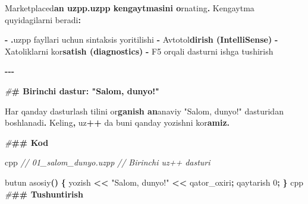 \documentclass[a4paper,11pt,twoside,openright]{book}
\newenvironment{Shaded}{\begin{snugshade}}{\end{snugshade}}
\newcommand{\CharTok}[1]{\textcolor[rgb]{0.31,0.60,0.02}{#1}}
\newcommand{\CommentTok}[1]{\textcolor[rgb]{0.56,0.35,0.01}{\textit{#1}}}
\newcommand{\DecValTok}[1]{\textcolor[rgb]{0.00,0.00,0.81}{#1}}
\newcommand{\ErrorTok}[1]{\textcolor[rgb]{0.64,0.00,0.00}{\textbf{#1}}}
\newcommand{\NormalTok}[1]{#1}
\newcommand{\OperatorTok}[1]{\textcolor[rgb]{0.81,0.36,0.00}{\textbf{#1}}}
\newcommand{\PreprocessorTok}[1]{\textcolor[rgb]{0.56,0.35,0.01}{\textit{#1}}}
\newcommand{\StringTok}[1]{\textcolor[rgb]{0.31,0.60,0.02}{#1}}
\begin{document}
\begin{Shaded}
\begin{Highlighting}[]
\NormalTok{Marketplace}\CharTok{\textquotesingle{}d}\ErrorTok{an \textasciigrave{}uzpp.uzpp\textasciigrave{} kengaytmasini o}\CharTok{\textquotesingle{}}\NormalTok{rnating}\OperatorTok{.}\NormalTok{ Kengaytma quyidagilarni beradi}\OperatorTok{:}

\OperatorTok{{-}} \ErrorTok{\textasciigrave{}}\OperatorTok{.}\NormalTok{uzpp}\ErrorTok{\textasciigrave{}}\NormalTok{ fayllari uchun sintaksis yoritilishi}
\OperatorTok{{-}}\NormalTok{ Avtoto}\CharTok{\textquotesingle{}l}\ErrorTok{dirish (IntelliSense)}
\OperatorTok{{-}}\NormalTok{ Xatoliklarni ko}\CharTok{\textquotesingle{}r}\ErrorTok{satish (diagnostics)}
\OperatorTok{{-}} \ErrorTok{\textasciigrave{}}\NormalTok{F5}\ErrorTok{\textasciigrave{}}\NormalTok{ orqali dasturni ishga tushirish}

\OperatorTok{{-}{-}{-}}

\PreprocessorTok{\#}\ErrorTok{\# Birinchi dastur: "Salom, dunyo!"}

\NormalTok{Har qanday dasturlash tilini o}\CharTok{\textquotesingle{}r}\ErrorTok{ganish an}\CharTok{\textquotesingle{}}\NormalTok{anaviy }\StringTok{"Salom, dunyo!"}\NormalTok{ dasturidan boshlanadi}\OperatorTok{.}\NormalTok{ Keling}\OperatorTok{,}\NormalTok{ uz}\OperatorTok{++}\NormalTok{ da buni qanday yozishni ko}\CharTok{\textquotesingle{}r}\ErrorTok{amiz.}

\PreprocessorTok{\#}\ErrorTok{\#\# Kod}

\ErrorTok{\textasciigrave{}\textasciigrave{}\textasciigrave{}}\NormalTok{cpp}
\CommentTok{// 01\_salom\_dunyo.uzpp}
\CommentTok{// Birinchi uz++ dasturi}

\NormalTok{butun asosiy}\OperatorTok{()} \OperatorTok{\{}
\NormalTok{    yozish }\OperatorTok{\textless{}\textless{}} \StringTok{"Salom, dunyo!"} \OperatorTok{\textless{}\textless{}}\NormalTok{ qator\_oxiri}\OperatorTok{;}
\NormalTok{    qaytarish }\DecValTok{0}\OperatorTok{;}
\OperatorTok{\}}
\ErrorTok{\textasciigrave{}\textasciigrave{}\textasciigrave{}}\NormalTok{cpp}
\PreprocessorTok{\#}\ErrorTok{\#\# Tushuntirish}


\end{Highlighting}
\end{Shaded}
\end{document}
